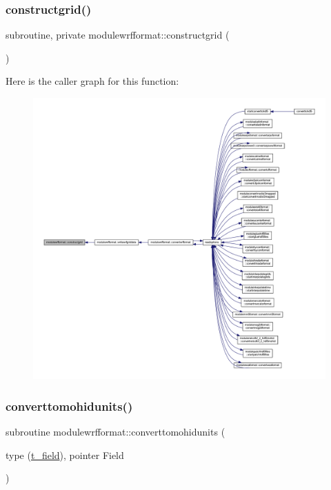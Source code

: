 \subsubsection{\texorpdfstring{constructgrid()}{constructgrid()}}
{\footnotesize\ttfamily subroutine, private modulewrfformat\+::constructgrid (\begin{DoxyParamCaption}{ }\end{DoxyParamCaption})\hspace{0.3cm}{\ttfamily [private]}}

Here is the caller graph for this function\+:\nopagebreak
\begin{figure}[H]
\begin{center}
\leavevmode
\includegraphics[width=350pt]{namespacemodulewrfformat_aa3ccdff7cc5b06191d188f87afe1905a_icgraph}
\end{center}
\end{figure}
\mbox{\label{namespacemodulewrfformat_a9a0d0071658920421e26356debdbac89}} 
\subsubsection{\texorpdfstring{converttomohidunits()}{converttomohidunits()}}
{\footnotesize\ttfamily subroutine modulewrfformat\+::converttomohidunits (\begin{DoxyParamCaption}\item[{type (\mbox{\hyperlink{structmodulewrfformat_1_1t__field}{t\+\_\+field}}), pointer}]{Field }\end{DoxyParamCaption})\hspace{0.3cm}{\ttfamily [private]}}

